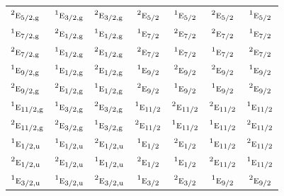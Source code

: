 \documentclass[10pt,a4paper]{article}
\numberwithin{equation}{section}
\newcommand{\irr}[1]{\text{\normalfont\scshape #1}}
\newcommand{\conjpair}[1]{{}^{#1}}
\newcommand{\ptag}[1]{\mathrm{#1}}
\begin{document}
{\begin{longtable}{@{}lcccccc@{}}
$\conjpair{2}\irr{e}_{5/2,\ptag{g}}$ & $\conjpair{1}\irr{e}_{3/2,\ptag{g}}$ & $\conjpair{2}\irr{e}_{3/2,\ptag{g}}$ & $\conjpair{2}\irr{e}_{5/2}$ & $\conjpair{1}\irr{e}_{5/2}$ & $\conjpair{2}\irr{e}_{5/2}$ & $\conjpair{1}\irr{e}_{5/2}$\\
$\conjpair{1}\irr{e}_{7/2,\ptag{g}}$ & $\conjpair{2}\irr{e}_{1/2,\ptag{g}}$ & $\conjpair{1}\irr{e}_{1/2,\ptag{g}}$ & $\conjpair{1}\irr{e}_{7/2}$ & $\conjpair{2}\irr{e}_{7/2}$ & $\conjpair{2}\irr{e}_{7/2}$ & $\conjpair{1}\irr{e}_{7/2}$\\
$\conjpair{2}\irr{e}_{7/2,\ptag{g}}$ & $\conjpair{1}\irr{e}_{1/2,\ptag{g}}$ & $\conjpair{2}\irr{e}_{1/2,\ptag{g}}$ & $\conjpair{2}\irr{e}_{7/2}$ & $\conjpair{1}\irr{e}_{7/2}$ & $\conjpair{1}\irr{e}_{7/2}$ & $\conjpair{2}\irr{e}_{7/2}$\\
$\conjpair{1}\irr{e}_{9/2,\ptag{g}}$ & $\conjpair{1}\irr{e}_{1/2,\ptag{g}}$ & $\conjpair{2}\irr{e}_{1/2,\ptag{g}}$ & $\conjpair{1}\irr{e}_{9/2}$ & $\conjpair{2}\irr{e}_{9/2}$ & $\conjpair{2}\irr{e}_{9/2}$ & $\conjpair{1}\irr{e}_{9/2}$\\
$\conjpair{2}\irr{e}_{9/2,\ptag{g}}$ & $\conjpair{2}\irr{e}_{1/2,\ptag{g}}$ & $\conjpair{1}\irr{e}_{1/2,\ptag{g}}$ & $\conjpair{2}\irr{e}_{9/2}$ & $\conjpair{1}\irr{e}_{9/2}$ & $\conjpair{1}\irr{e}_{9/2}$ & $\conjpair{2}\irr{e}_{9/2}$\\
$\conjpair{1}\irr{e}_{11/2,\ptag{g}}$ & $\conjpair{1}\irr{e}_{3/2,\ptag{g}}$ & $\conjpair{2}\irr{e}_{3/2,\ptag{g}}$ & $\conjpair{1}\irr{e}_{11/2}$ & $\conjpair{2}\irr{e}_{11/2}$ & $\conjpair{2}\irr{e}_{11/2}$ & $\conjpair{1}\irr{e}_{11/2}$\\
$\conjpair{2}\irr{e}_{11/2,\ptag{g}}$ & $\conjpair{2}\irr{e}_{3/2,\ptag{g}}$ & $\conjpair{1}\irr{e}_{3/2,\ptag{g}}$ & $\conjpair{2}\irr{e}_{11/2}$ & $\conjpair{1}\irr{e}_{11/2}$ & $\conjpair{1}\irr{e}_{11/2}$ & $\conjpair{2}\irr{e}_{11/2}$\\
$\conjpair{1}\irr{e}_{1/2,\ptag{u}}$ & $\conjpair{1}\irr{e}_{1/2,\ptag{u}}$ & $\conjpair{2}\irr{e}_{1/2,\ptag{u}}$ & $\conjpair{1}\irr{e}_{1/2}$ & $\conjpair{2}\irr{e}_{1/2}$ & $\conjpair{1}\irr{e}_{11/2}$ & $\conjpair{2}\irr{e}_{11/2}$\\
$\conjpair{2}\irr{e}_{1/2,\ptag{u}}$ & $\conjpair{2}\irr{e}_{1/2,\ptag{u}}$ & $\conjpair{1}\irr{e}_{1/2,\ptag{u}}$ & $\conjpair{2}\irr{e}_{1/2}$ & $\conjpair{1}\irr{e}_{1/2}$ & $\conjpair{2}\irr{e}_{11/2}$ & $\conjpair{1}\irr{e}_{11/2}$\\
$\conjpair{1}\irr{e}_{3/2,\ptag{u}}$ & $\conjpair{1}\irr{e}_{3/2,\ptag{u}}$ & $\conjpair{2}\irr{e}_{3/2,\ptag{u}}$ & $\conjpair{1}\irr{e}_{3/2}$ & $\conjpair{2}\irr{e}_{3/2}$ & $\conjpair{1}\irr{e}_{9/2}$ & $\conjpair{2}\irr{e}_{9/2}$\\

\end{longtable}}
\end{document}
